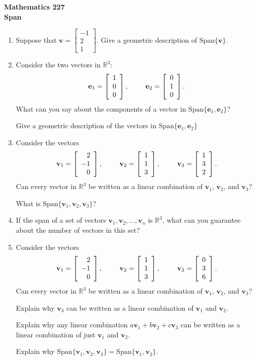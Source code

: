 \documentclass[12pt]{article}
\newcommand{\vs}[1]{\vspace{#1in}}
\newcommand{\evec}{{\mathbf e}}
\newcommand{\vvec}{{\mathbf v}}
\newcommand{\real}{{\mathbb R}}
\newcommand{\threevec}[3]{\left[\begin{array}{r}#1 \\ #2 \\ #3
  \end{array}\right]}
\renewcommand{\span}[1]{\text{Span}\{#1\}}
\begin{document}
\noindent
{\bf Mathematics 227} \\ 
{\bf Span}

\bigskip
\begin{enumerate}
\item Suppose that $\vvec = \threevec{-1}21$.  Give a geometric
  description of $\span{\vvec}$.
  
  \vs{1.25}
\item Consider the two vectors in $\real^3$:
  $$
  \evec_1 = \threevec100,\hspace*{24pt}
  \evec_2 = \threevec010.
  $$
  What can you say about the components of a vector in
  $\span{\evec_1,\evec_2}$?

  \vs{1.25}
  Give a geometric description of the vectors in
  $\span{\evec_1,\evec_2}$

  \vs{1}

\item Consider the vectors 
  $$
  \vvec_1 = \threevec2{-1}0,\hspace*{24pt}
  \vvec_2 = \threevec113,\hspace*{24pt}
  \vvec_3 = \threevec132.
  $$
  Can every vector in $\real^3$ be written as a linear combination of
  $\vvec_1$, $\vvec_2$, and $\vvec_3$?

  \vs{1}
  \newpage
  What is $\span{\vvec_1,\vvec_2,\vvec_3}$?

  \vs{0.75}

\item If the span of a set of vectors $\vvec_1,\vvec_2,\ldots,\vvec_n$
  is $\real^3$, what can you guarantee about the number of vectors in
  this set?

  \vs{1.25}
\item Consider the vectors
  $$
  \vvec_1 = \threevec2{-1}0,\hspace*{24pt}
  \vvec_2 = \threevec113,\hspace*{24pt}
  \vvec_3 = \threevec036.
  $$
  Can every vector in $\real^3$ be written as a linear combination of
  $\vvec_1$, $\vvec_2$, and $\vvec_3$?

  \vs{1}
  Explain why $\vvec_3$ can be written as a linear combination of
  $\vvec_1$ and $\vvec_2$.

  \vs{1}
  Explain why any linear combination $a\vvec_1+b\vvec_2+c\vvec_3$ can
  be written as a linear combination of just $\vvec_1$ and $\vvec_2$.

  \vs{1}
  Explain why $\span{\vvec_1,\vvec_2,\vvec_3} = \span{\vvec_1,\vvec_2}$.
  

  

  


                                          


  

\end{enumerate}
\end{document}
